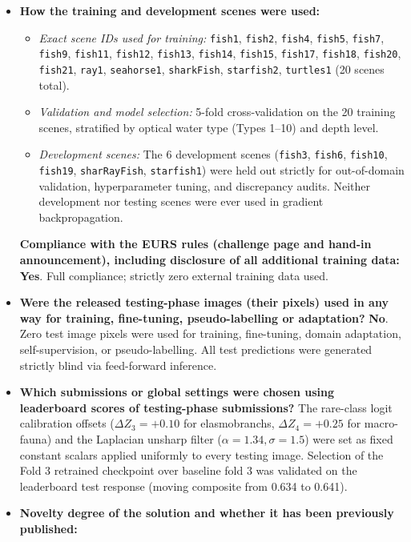\documentclass{article}
\begin{document}
\begin{itemize}[leftmargin=*]
\item \textbf{How the training and development scenes were used:}
  \begin{itemize}
    \item \emph{Exact scene IDs used for training:} \texttt{fish1}, \texttt{fish2}, \texttt{fish4}, \texttt{fish5}, \texttt{fish7}, \texttt{fish9}, \texttt{fish11}, \texttt{fish12}, \texttt{fish13}, \texttt{fish14}, \texttt{fish15}, \texttt{fish17}, \texttt{fish18}, \texttt{fish20}, \texttt{fish21}, \texttt{ray1}, \texttt{seahorse1}, \texttt{sharkFish}, \texttt{starfish2}, \texttt{turtles1} (20 scenes total).
    \item \emph{Validation and model selection:} 5-fold cross-validation on the 20 training scenes, stratified by optical water type (Types 1--10) and depth level.
    \item \emph{Development scenes:} The 6 development scenes (\texttt{fish3}, \texttt{fish6}, \texttt{fish10}, \texttt{fish19}, \texttt{sharRayFish}, \texttt{starfish1}) were held out strictly for out-of-domain validation, hyperparameter tuning, and discrepancy audits. Neither development nor testing scenes were ever used in gradient backpropagation.
  \end{itemize}
  \textbf{Compliance with the EURS rules (challenge page and hand-in announcement), including disclosure of all additional training data:} \textbf{Yes}. Full compliance; strictly zero external training data used.
\item \textbf{Were the released testing-phase images (their pixels) used in any way for training, fine-tuning, pseudo-labelling or adaptation?} \textbf{No}. Zero test image pixels were used for training, fine-tuning, domain adaptation, self-supervision, or pseudo-labelling. All test predictions were generated strictly blind via feed-forward inference.
\item \textbf{Which submissions or global settings were chosen using leaderboard scores of testing-phase submissions?}
  The rare-class logit calibration offsets ($\Delta Z_3 = +0.10$ for elasmobranchs, $\Delta Z_4 = +0.25$ for macro-fauna) and the Laplacian unsharp filter ($\alpha=1.34, \sigma=1.5$) were set as fixed constant scalars applied uniformly to every testing image. Selection of the Fold 3 retrained checkpoint over baseline fold 3 was validated on the leaderboard test response (moving composite from 0.634 to 0.641).
\item \textbf{Novelty degree of the solution and whether it has been previously published:}

\end{itemize}
\end{document}
